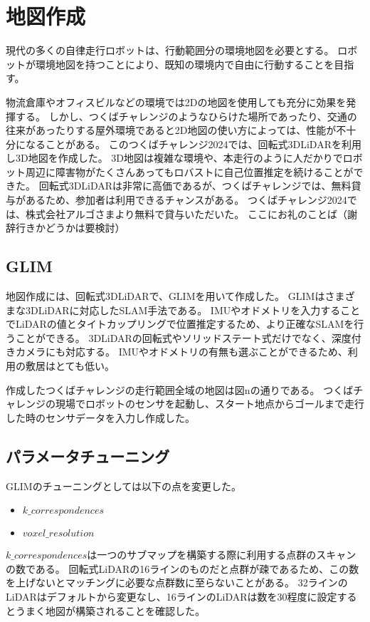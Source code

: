 \section{地図作成}
現代の多くの自律走行ロボットは、行動範囲分の環境地図を必要とする。
ロボットが環境地図を持つことにより、既知の環境内で自由に行動することを目指す。

物流倉庫やオフィスビルなどの環境では2Dの地図を使用しても充分に効果を発揮する。
しかし、つくばチャレンジのようなひらけた場所であったり、交通の往来があったりする屋外環境であると2D地図の使い方によっては、性能が不十分になることがある。
このつくばチャレンジ2024では、回転式3DLiDARを利用し3D地図を作成した。
3D地図は複雑な環境や、本走行のように人だかりでロボット周辺に障害物がたくさんあってもロバストに自己位置推定を続けることができた。
回転式3DLiDARは非常に高価であるが、つくばチャレンジでは、無料貸与があるため、参加者は利用できるチャンスがある。
つくばチャレンジ2024では、株式会社アルゴさまより無料で貸与いただいた。
ここにお礼のことば（謝辞行きかどうかは要検討）

\subsection{GLIM}
地図作成には、回転式3DLiDARで、GLIM\cite{GLIM}を用いて作成した。
GLIMはさまざまな3DLiDARに対応したSLAM手法である。
IMUやオドメトリを入力することでLiDARの値とタイトカップリングで位置推定するため、より正確なSLAMを行うことができる。
3DLiDARの回転式やソリッドステート式だけでなく、深度付きカメラにも対応する。
IMUやオドメトリの有無も選ぶことができるため、利用の敷居はとても低い。

作成したつくばチャレンジの走行範囲全域の地図は図nの通りである。
つくばチャレンジの現場でロボットのセンサを起動し、スタート地点からゴールまで走行した時のセンサデータを入力し作成した。

\subsection{パラメータチューニング}
GLIMのチューニングとしては以下の点を変更した。
\begin{itemize}
    \item $k\_correspondences$
    \item $voxel\_resolution$
\end{itemize}

$k\_correspondences$は一つのサブマップを構築する際に利用する点群のスキャンの数である。
回転式LiDARの16ラインのものだと点群が疎であるため、この数を上げないとマッチングに必要な点群数に至らないことがある。
32ラインのLiDARはデフォルトから変更なし、16ラインのLiDARは数を30程度に設定するとうまく地図が構築されることを確認した。

